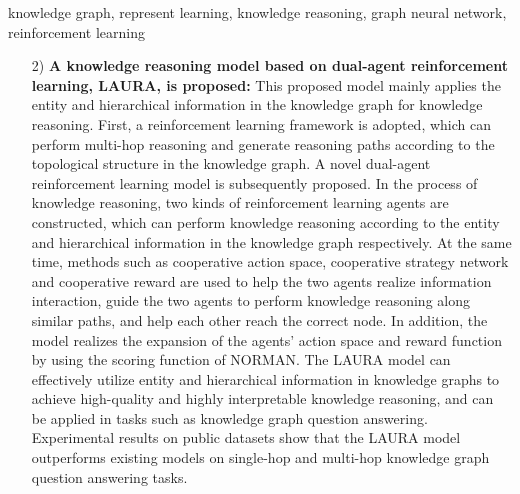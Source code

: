 \documentclass[algorithmlist, AutoFakeBold, AutoFakeSlant, figurelist, tablelist, nomlist, engineering, openany]{seuthesix} %
\begin{document}
\begin{englishabstract}{knowledge graph, represent learning, knowledge reasoning, graph neural network, reinforcement learning}
\begin{itemize}
    Then a graph neural network model is proposed. The model first uses the vector obtained from the hierarchical information extraction process to obtain the initial vector of the model through the fully connected layer mapping, and then implements neighborhood subgraph construction and message delivery in a recursive manner, and implements vector update through message aggregation and information update.
    The NORMAN model can effectively capture the hierarchical and neighborhood information in the knowledge graph, perform high-quality knowledge representation, and can be applied in tasks such as knowledge graph completion.
    Experimental results on public datasets show that the NORMAN model outperforms existing models on knowledge graph completion tasks.
    \item [2)]\textbf{A knowledge reasoning model based on dual-agent reinforcement learning, LAURA, is proposed:}
    This proposed model mainly applies the entity and hierarchical information in the knowledge graph for knowledge reasoning.
    First, a reinforcement learning framework is adopted, which can perform multi-hop reasoning and generate reasoning paths according to the topological structure in the knowledge graph.
    A novel dual-agent reinforcement learning model is subsequently proposed. In the process of knowledge reasoning, two kinds of reinforcement learning agents are constructed, which can perform knowledge reasoning according to the entity and hierarchical information in the knowledge graph respectively. At the same time, methods such as cooperative action space, cooperative strategy network and cooperative reward are used to help the two agents realize information interaction, guide the two agents to perform knowledge reasoning along similar paths, and help each other reach the correct node.
    In addition, the model realizes the expansion of the agents' action space and reward function by using the scoring function of NORMAN.
    The LAURA model can effectively utilize entity and hierarchical information in knowledge graphs to achieve high-quality and highly interpretable knowledge reasoning, and can be applied in tasks such as knowledge graph question answering.
    Experimental results on public datasets show that the LAURA model outperforms existing models on single-hop and multi-hop knowledge graph question answering tasks.
  \end{itemize}
\end{englishabstract} 

\tableofcontents
\mainmatter  %
\end{document}
